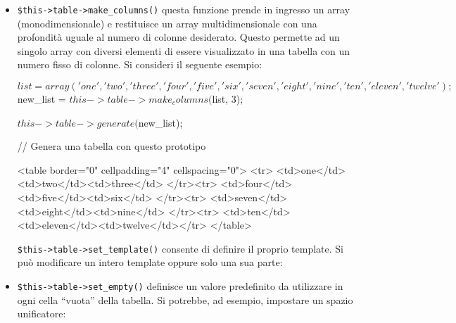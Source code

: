 \begin{itemize}

\item \verb|$this->table->make_columns()| questa funzione prende in ingresso un array (monodimensionale) e restituisce un array multidimensionale con una profondità uguale al numero di colonne desiderato. Questo permette ad un singolo array con diversi elementi di essere visualizzato in una tabella con un numero fisso di colonne. Si consideri il seguente esempio:

\begin{html}
$list = array('one', 'two', 'three', 'four', 'five', 'six', 'seven', 'eight', 'nine', 'ten', 'eleven', 'twelve');

$new_list = $this->table->make_columns($list, 3);

$this->table->generate($new_list);

// Genera una tabella con questo prototipo

<table border="0" cellpadding="4" cellspacing="0">
<tr>
<td>one</td><td>two</td><td>three</td>
</tr><tr>
<td>four</td><td>five</td><td>six</td>
</tr><tr>
<td>seven</td><td>eight</td><td>nine</td>
</tr><tr>
<td>ten</td><td>eleven</td><td>twelve</td></tr>
</table>
\end{html}

\verb|$this->table->set_template()| consente di definire il proprio template. Si può modificare un intero template oppure solo una sua parte:


\item \verb|$this->table->set_empty()| definisce un valore predefinito da utilizzare in ogni cella ``vuota'' della tabella. Si potrebbe, ad esempio, impostare un spazio unificatore:



\end{itemize}
